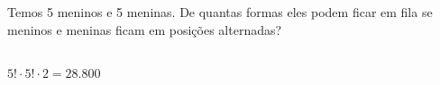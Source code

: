 \begin{ex}
 Temos 5 meninos e 5 meninas. De quantas formas eles podem ficar em fila se meninos e meninas ficam em posições alternadas?
  \begin{sol}
    \phantom{A}\\
    $5!\cdot5!\cdot2=28.800$
  \end{sol}
\end{ex}